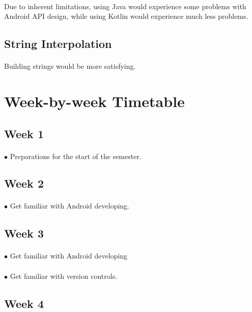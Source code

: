 \documentclass[paper=a4, fontsize=11pt]{scrartcl} %
\begin{document}
\paragraph{} Due to inherent limitations, using Java would experience some problems with Android API design, while using Kotlin would experience much less problems.
\subsection{String Interpolation}
\paragraph{} Building strings would be more satisfying.

\section{Week-by-week Timetable}
\subsection{Week 1}
\paragraph{}$\bullet$ Preparations for the start of the semester.
\subsection{Week 2}
\paragraph{}$\bullet$ Get familiar with Android developing.
\subsection{Week 3}
\paragraph{}$\bullet$ Get familiar with Android developing
\paragraph{}$\bullet$ Get familiar with version controls.
\subsection{Week 4}
\end{document}
